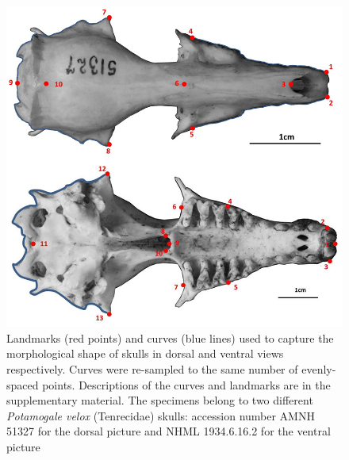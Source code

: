 \documentclass[12pt,a4paper]{article}
\begin{document}

	\begin{figure}
	\centering
	\includegraphics[width=1\linewidth]{figures/SkDors+Skvent_landmark_diagrams.png}
	
	\caption[Diagram of the landmarks and curves for the skulls in dorsal and ventral views]
		{Landmarks (red points) and curves (blue lines) used to capture the morphological shape of skulls in dorsal and ventral views respectively. Curves were re-sampled to the same number of evenly-spaced points. Descriptions of the curves and landmarks are in the supplementary material. The specimens belong to two different \textit{Potamogale velox} (Tenrecidae) skulls: accession number AMNH 51327 for the dorsal picture and NHML 1934.6.16.2 for the ventral picture}
	
	\label{fig:skdors_skvent_landmarks}
	\end{figure}
\end{document}
